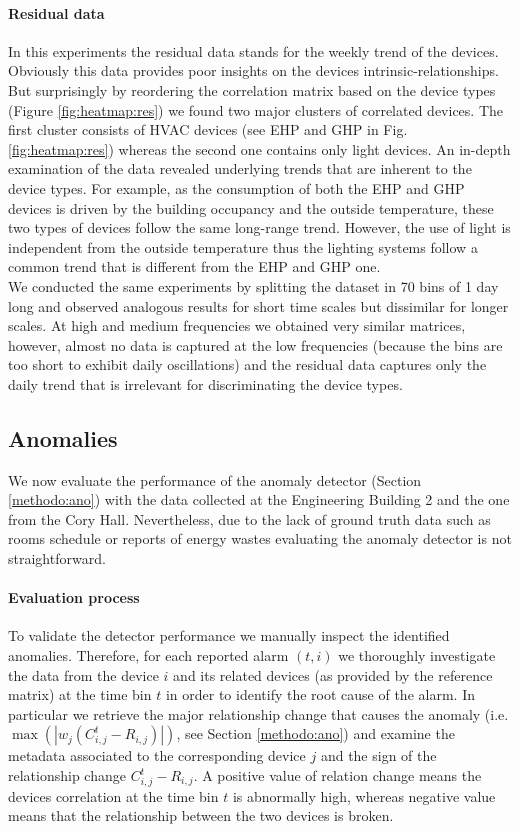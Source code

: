 \paragraph{Residual data}
In this experiments the residual data stands for the weekly trend of the devices.
Obviously this data provides poor insights on the devices intrinsic-relationships.
But surprisingly by reordering the correlation matrix based on the device types (Figure \ref{fig:heatmap:res}) we found two major clusters of correlated devices.
The first cluster consists of HVAC devices (see EHP and GHP in Fig. \ref{fig:heatmap:res}) whereas the second one contains only light devices. 
An in-depth examination of the data revealed underlying trends that are inherent to the device types. 
For example, as the consumption of both the EHP and GHP devices is driven by the building occupancy and the outside temperature, these two types of devices follow the same long-range trend. 
However, the use of light is independent from the outside temperature thus the lighting systems follow a common trend that is different from the EHP and GHP one.
~\\

We conducted the same experiments by splitting the dataset in 70 bins of 1 day long and observed analogous results for short time scales but dissimilar for longer scales.
At high and medium frequencies we obtained very similar matrices, however, almost no data is captured at the low frequencies (because the bins are too short to exhibit daily oscillations) and the residual data captures only the daily trend that is irrelevant for discriminating the device types.


\subsection{Anomalies}
We now evaluate the performance of the anomaly detector (Section \ref{methodo:ano}) with the data collected at the Engineering Building 2 and the one from the Cory Hall.
Nevertheless, due to the lack of ground truth data such as rooms schedule or reports of energy wastes evaluating the anomaly detector is not straightforward.

\paragraph{Evaluation process}
To validate the detector performance we manually inspect the identified anomalies.
Therefore, for each reported alarm $(t,i)$ we thoroughly investigate the data from the device $i$ and its related devices (as provided by the reference matrix) at the time bin $t$ in order to identify the root cause of the alarm.
In particular we retrieve the major relationship change that causes the anomaly (i.e. $\max(|w_j(C_{i,j}^t - R_{i,j})|)$, see Section \ref{methodo:ano}) and examine the metadata associated to the corresponding device $j$ and the sign of the relationship change $C_{i,j}^t - R_{i,j}$.
A positive value of relation change means the devices correlation at the time bin $t$ is abnormally high, whereas negative value means that the relationship between the two devices is broken.


